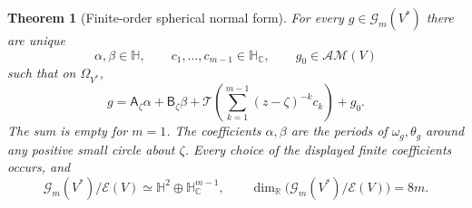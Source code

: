 \documentclass[11pt,a4paper]{article}
\numberwithin{equation}{section}
\newtheorem{theorem}{Theorem}[section]
\theoremstyle{definition}
\theoremstyle{remark}
\newcommand{\R}{\mathbb R}
\newcommand{\C}{\mathbb C}
\newcommand{\HH}{\mathbb H}
\newcommand{\HC}{\mathbb H_{\C}}
\newcommand{\AM}{\mathcal{AM}}
\newcommand{\T}{\mathcal T}
\newcommand{\Adef}{\mathsf A}
\newcommand{\Bdef}{\mathsf B}
\begin{document}
\begin{theorem}[Finite-order spherical normal form]\label{thm:local-normal}
For every $g\in\mathcal G_m(V^*)$ there are unique
\[
 \alpha,\beta\in\HH,\qquad c_1,\ldots,c_{m-1}\in\HC,
 \qquad g_0\in\AM(V)
\]
such that on $\Omega_{V^*}$,
\begin{equation}
 g=\Adef_\zeta\alpha+\Bdef_\zeta\beta
       +\T\left(\sum_{k=1}^{m-1}(z-\zeta)^{-k}c_k\right)+g_0.
 \label{eq:local-normal}
\end{equation}
The sum is empty for $m=1$. The coefficients $\alpha,\beta$ are the
periods of $\omega_g,\theta_g$ around any positive small circle about
$\zeta$. Every choice of the displayed finite coefficients occurs, and
\begin{equation}
 \mathcal G_m(V^*)/\mathcal E(V)
      \simeq \HH^2\oplus\HC^{m-1},\qquad
 \dim_{\R}\bigl(\mathcal G_m(V^*)/\mathcal E(V)\bigr)=8m.
 \label{eq:singular-dimension}
\end{equation}
\end{theorem}
\end{document}
